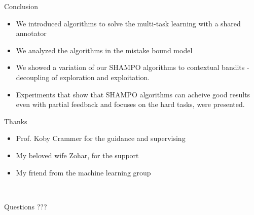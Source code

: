 \documentclass{beamer}
\begin{document}
\begin{frame}{Conclusion}
\begin{itemize}
\item We introduced algorithms to solve the multi-task learning with a shared annotator\newline
\item We analyzed the algorithms in the mistake bound model  \newline
\item We showed a variation of our SHAMPO algorithms to contextual bandits - decoupling of exploration and exploitation.\newline
\item Experiments that show that SHAMPO algorithms can acheive good results even with partial feedback and focuses on the hard tasks, were presented. \newline
\end{itemize}
\end{frame}

\begin{frame}{Thanks }
\begin{itemize}
\item Prof. Koby Crammer for  the guidance and  supervising\newline
\item My beloved wife Zohar, for the support\newline
\item My friend  from the machine learning group\newline
\end{itemize}

\end{frame}

\begin{frame}{~}
\begin{center}
\begin{Huge}Questions ???\end{Huge}
\end{center}
\end{frame}
\end{document}
